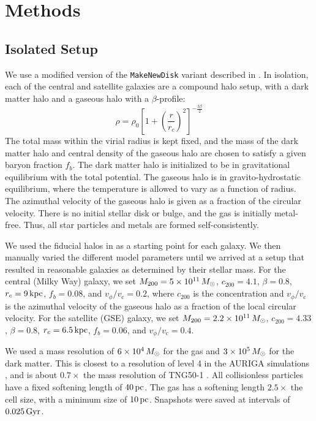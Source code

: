 \section{Methods}\label{sec:methods}
\subsection{Isolated Setup}\label{ssec:iso_setup}
We use a modified version of the \texttt{MakeNewDisk} variant described in \citet{2023MNRAS.tmp.2070B}. In isolation, each of the central and satellite galaxies are a compound halo setup, with a \citet{1990ApJ...356..359H} dark matter halo and a gaseous halo with a $\beta$-profile:
\begin{equation*}
\rho = \rho_0 \left[1 + \left(\frac{r}{r_c}\right)^2\right]^{-\frac{3\beta}{2}}
\end{equation*}
The total mass within the virial radius is kept fixed, and the mass of the dark matter halo and central density of the gaseous halo are chosen to satisfy a given baryon fraction $f_b$. The dark matter halo is initialized to be in gravitational equilibrium with the total potential. The gaseous halo is in gravito-hydrostatic equilibrium, where the temperature is allowed to vary as a function of radius. The azimuthal velocity of the gaseous halo is given as a fraction of the circular velocity. There is no initial stellar disk or bulge, and the gas is initially metal-free. Thus, all star particles and metals are formed self-consistently.

We used the fiducial halos in \citet{2021ApJ...923...92N} as a starting point for each galaxy. We then manually varied the different model parameters until we arrived at a setup that resulted in reasonable galaxies as determined by their stellar mass. For the central (Milky Way) galaxy, we set $M_{200}=5\times10^{11}\,M_{\odot}$, $c_{200}=4.1$, $\beta=0.8$, $r_c=9\,\textrm{kpc}$, $f_b=0.08$, and $v_{\phi}/v_{\textrm{c}}=0.2$, where $c_{200}$ is the concentration and $v_{\phi}/v_{\textrm{c}}$ is the azimuthal velocity of the gaseous halo as a fraction of the local circular velocity. For the satellite (GSE) galaxy, we set $M_{200}=2.2\times10^{11}\,M_{\odot}$, $c_{200}=4.33$, $\beta=0.8$, $r_c=6.5\,\textrm{kpc}$, $f_b=0.06$, and $v_{\phi}/v_{\textrm{c}}=0.4$.

We used a mass resolution of $6\times10^4\,M_{\odot}$ for the gas and $3\times10^5\,M_{\odot}$ for the dark matter. This is closest to a resolution of level 4 in the AURIGA simulations \citep{2017MNRAS.467..179G}, and is about $0.7\times$ the mass resolution of TNG50-1 \citep{2019MNRAS.490.3234N,2019MNRAS.490.3196P}. All collisionless particles have a fixed softening length of $40\,\textrm{pc}$. The gas has a softening length $2.5\times$ the cell size, with a minimum size of $10\,\textrm{pc}$. Snapshots were saved at intervals of $0.025\,\textrm{Gyr}$.

